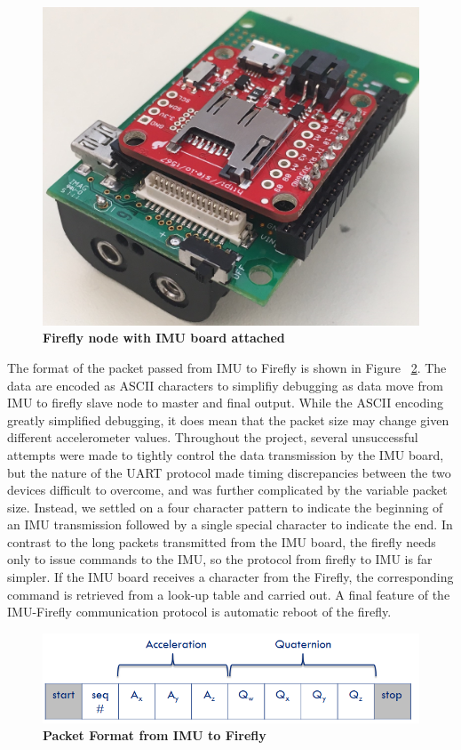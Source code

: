 \documentclass[conference]{IEEEtran}
\begin{document}
\begin{figure}[ht]
  \centering
  \includegraphics[width=0.6\columnwidth]{figs/cropped2}
  \caption{{\bf Firefly node with IMU board attached}}
  \label{fig:ff}
\end{figure}

  The format of the packet passed from IMU to Firefly is shown in
Figure ~\ref{fig:packet}. The data are encoded as ASCII characters to simplifiy debugging
as data move from IMU to firefly slave node to master and final output. While the ASCII
encoding greatly simplified debugging, it does mean that the packet size may change given
different accelerometer values.  Throughout the project, several unsuccessful attempts
were made to tightly control the data transmission by the IMU board, but the nature of the
UART protocol made timing discrepancies between the two devices difficult to overcome, and
was further complicated by the variable packet size. Instead, we settled on a four
character pattern to indicate the beginning of an IMU transmission followed by a single
special character to indicate the end. In contrast to the long packets transmitted from
the IMU board, the firefly needs only to issue commands to the IMU, so the protocol from
firefly to IMU is far simpler. If the IMU board receives a character from the Firefly, the
corresponding command is retrieved from a look-up table and carried out. A final feature
of the IMU-Firefly communication protocol is automatic reboot of the firefly. 

\begin{figure}[h]
  \centering
  \includegraphics[width=0.8\columnwidth]{figs/packet}
  \caption{{\bf Packet Format from IMU to Firefly}}
  \label{fig:packet}
\end{figure}
\end{document}
